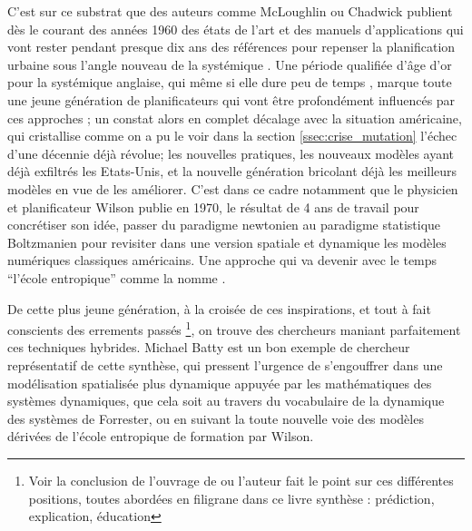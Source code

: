 C'est sur ce substrat \autocite[253]{Batty1978} que des auteurs comme McLoughlin ou Chadwick publient dès le courant des années 1960 des états de l'art et des manuels d'applications qui vont rester pendant presque dix ans des références pour repenser la planification urbaine sous l'angle nouveau de la systémique \autocite[719]{Davies1997}. Une période qualifiée d'âge d'or pour la systémique anglaise, qui même si elle dure peu de temps \autocites[726-727]{Davies1997}{McLoughin1985}, marque toute une jeune génération de planificateurs qui vont être profondément influencés par ces approches \autocite[256]{Batty1978}; un constat alors en complet décalage avec la situation américaine, qui cristallise comme on a pu le voir dans la section \ref{ssec:crise_mutation} l'échec d'une décennie déjà révolue; les nouvelles pratiques, les nouveaux modèles ayant déjà exfiltrés les Etats-Unis, et la nouvelle génération bricolant déjà les meilleurs modèles en vue de les améliorer. C'est dans ce cadre notamment que le physicien et planificateur Wilson publie en 1970, le résultat de 4 ans de travail pour concrétiser son idée, passer du paradigme newtonien au paradigme statistique Boltzmanien pour revisiter dans une version spatiale et dynamique les modèles numériques classiques américains. \autocite{Wilson2010} Une approche qui va devenir avec le temps \enquote{l'école entropique} comme la nomme \textcite{Guermond1984}.

De cette plus jeune génération, à la croisée de ces inspirations, et tout à fait conscients des errements passés \footnote{Voir la conclusion de l'ouvrage de \textcite[357]{Batty1976} ou l'auteur fait le point sur ces différentes positions, toutes abordées en filigrane dans ce livre synthèse : prédiction, explication, éducation }, on trouve des chercheurs maniant parfaitement ces techniques hybrides. Michael Batty est un bon exemple de chercheur représentatif de cette synthèse, qui pressent l'urgence de s'engouffrer dans une modélisation spatialisée plus dynamique \autocite{Batty1971,Batty1972} appuyée par les mathématiques des systèmes dynamiques, que cela soit au travers du vocabulaire de la dynamique des systèmes de Forrester, ou en suivant la toute nouvelle voie des modèles dérivées de l'école entropique de formation par Wilson.


